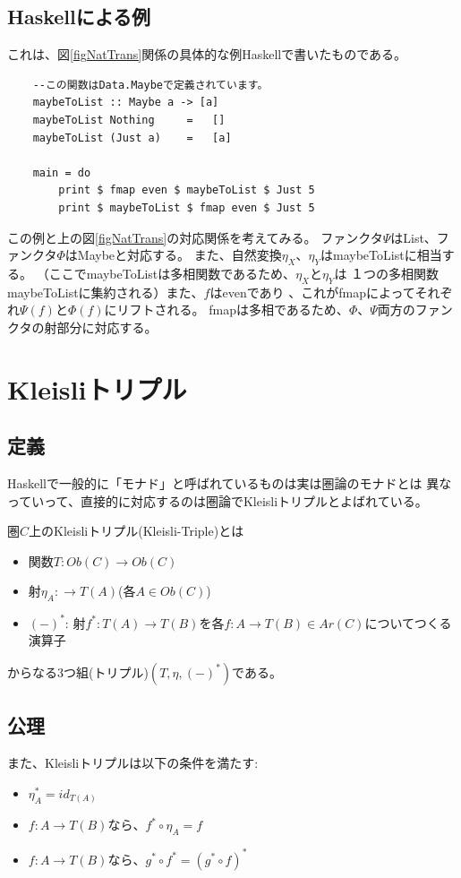 \documentclass{jsarticle}
\begin{document}
\subsection{Haskellによる例}
これは、図\ref{figNatTrans}関係の具体的な例Haskellで書いたものである。
\begin{lstlisting}
    --この関数はData.Maybeで定義されています。
    maybeToList :: Maybe a -> [a]
    maybeToList Nothing     =   []
    maybeToList (Just a)    =   [a]

    main = do
        print $ fmap even $ maybeToList $ Just 5
        print $ maybeToList $ fmap even $ Just 5
\end{lstlisting}
この例と上の図\ref{figNatTrans}の対応関係を考えてみる。
ファンクタ$\Psi$はList、ファンクタ$\Phi$はMaybeと対応する。
また、自然変換$\eta_X$、$\eta_Y$はmaybeToListに相当する。
（ここでmaybeToListは多相関数であるため、$\eta_X$と$\eta_Y$は
１つの多相関数maybeToListに集約される）また、$f$はevenであり
、これがfmapによってそれぞれ$\Psi(f)$と$\Phi(f)$にリフトされる。
fmapは多相であるため、$\Phi$、$\Psi$両方のファンクタの射部分に対応する。

\newpage
\section{Kleisliトリプル}

\subsection{定義}
Haskellで一般的に「モナド」と呼ばれているものは実は圏論のモナドとは
異なっていって、直接的に対応するのは圏論でKleisliトリプルとよばれている。

圏$C$上のKleisliトリプル(Kleisli-Triple)とは
\begin{itemize}
    \item 関数$T:Ob(C)\to Ob(C)$
    \item 射$\eta_A:\to T(A)$(各$A\in Ob(C)$)
    \item $(-)^*$: 射$f^*:T(A)\to T(B)$を各$f:A\to T(B)\in Ar(C)$についてつくる演算子
\end{itemize}
からなる3つ組(トリプル)$(T, \eta, (-)^*)$である。

\subsection{公理}
また、Kleisliトリプルは以下の条件を満たす:
\begin{itemize}
    \item $\eta_A^*=id_{T(A)}$
    \item $f:A\to T(B)$なら、$f^*\circ \eta_A=f$
    \item $f:A\to T(B)$なら、$g^*\circ f^*=(g^*\circ f)^*$
\end{itemize}
\end{document}
